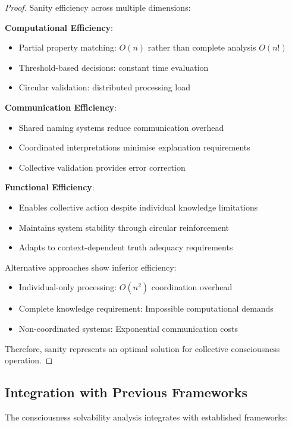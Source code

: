 \documentclass[12pt,a4paper]{article}
\begin{document}
\begin{proof}
Sanity efficiency across multiple dimensions:

\textbf{Computational Efficiency}:
\begin{itemize}
\item Partial property matching: $O(n)$ rather than complete analysis $O(n!)$
\item Threshold-based decisions: constant time evaluation
\item Circular validation: distributed processing load
\end{itemize}

\textbf{Communication Efficiency}:
\begin{itemize}
\item Shared naming systems reduce communication overhead
\item Coordinated interpretations minimise explanation requirements
\item Collective validation provides error correction
\end{itemize}

\textbf{Functional Efficiency}:
\begin{itemize}
\item Enables collective action despite individual knowledge limitations
\item Maintains system stability through circular reinforcement
\item Adapts to context-dependent truth adequacy requirements
\end{itemize}

Alternative approaches show inferior efficiency:
\begin{itemize}
\item Individual-only processing: $O(n^2)$ coordination overhead
\item Complete knowledge requirement: Impossible computational demands
\item Non-coordinated systems: Exponential communication costs
\end{itemize}

Therefore, sanity represents an optimal solution for collective consciousness operation.
\end{proof}

\subsection{Integration with Previous Frameworks}

The consciousness solvability analysis integrates with established frameworks:
\end{document}
